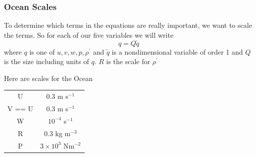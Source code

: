 \documentclass[xcolor=dvipsnames]{beamer}
\begin{document}

\begin{frame}
  \frametitle{Ocean Scales}   %

To determine which terms in the equations are really important, we want to scale the terms.  So for each of our five variables we will write
\[ q = Q \tilde q \]
where $q$ is one of $u,v,w,p,\rho^\prime$ and $\tilde q$ is a nondimensional variable of order 1 and $Q$ is the size including units of $q$.  $R$ is the scale for $\rho^\prime$

Here are scales for the Ocean\\ \vspace{0.2in}

\begin{center}
\begin{tabular}{cc}
\hline
U & 0.3 m s$^{-1}$\\
V == U & 0.3 m s$^{-1}$\\
W & $10^{-4}$  s$^{-1}$\\
R & 0.3 kg m$^{-3}$\\
P & $3 \times 10^3$ Nm$^{-2}$\\
\hline
\end{tabular}
\end{center}
\end{frame}
\end{document}
